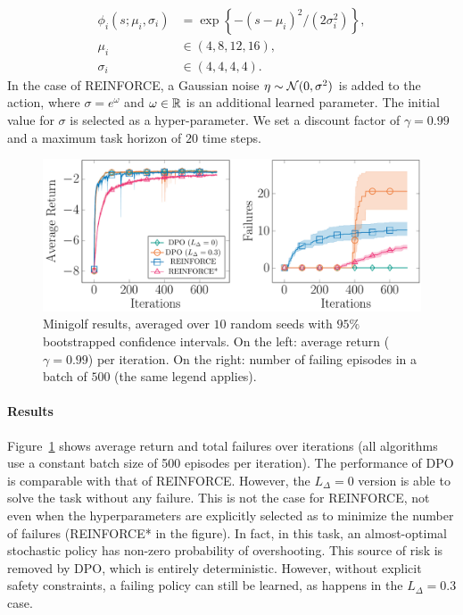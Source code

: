 \begin{align}
\phi_i(s; \mu_i, \sigma_i) &= \exp\left\{-{(s -\mu_i)^2}\big/{(2\sigma_i^2)}\right\}, \nonumber \\
\mu_i &\in (4, 8, 12, 16), \nonumber \\
\sigma_i &\in(4, 4, 4, 4). \nonumber
\end{align}
In the case of REINFORCE, a Gaussian noise $\eta\sim\mathcal{N}(0,\sigma^2)$ is added to the action, where $\sigma=e^{\omega}$ and $\omega\in\mathbb{R}$ is an additional learned parameter. The initial value for $\sigma$ is selected as a hyper-parameter.
We set a discount factor of $\gamma=0.99$ and a maximum task horizon of $20$ time steps.
\begin{figure}[t]
	\includegraphics[width=\columnwidth]{plots/minigolf.pdf}
	\caption{Minigolf results, averaged over $10$ random seeds with $95\%$ bootstrapped confidence intervals. On the left: average return ($\gamma=0.99$) per iteration. On the right: number of failing episodes in a batch of $500$ (the same legend applies).}
	\label{fig:minigolf}
\end{figure}

\paragraph{Results}
Figure~\ref{fig:minigolf} shows average return and total failures over iterations (all algorithms use a constant batch size of 500 episodes per iteration). The performance of \ac{DPO} is comparable with that of REINFORCE. However, the $L_{\Delta}=0$ version is able to solve the task without any failure. This is not the case for REINFORCE, not even when the hyperparameters are explicitly selected as to minimize the number of failures (REINFORCE* in the figure). In fact, in this task, an almost-optimal stochastic policy has non-zero probability of overshooting. This source of risk is removed by \ac{DPO}, which is entirely deterministic. However, without explicit safety constraints, a failing policy can still be learned, as happens in the $L_{\Delta}=0.3$ case.

